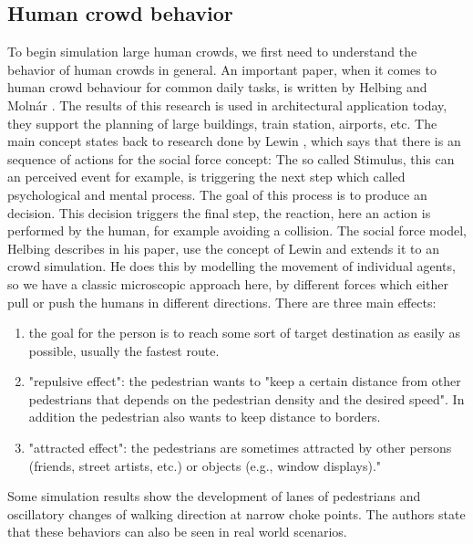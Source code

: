 \documentclass{acmsiggraph}               %
\begin{document}
\subsection{Human crowd behavior}
\label{chap:helbing} To begin simulation large human crowds, we first need to understand the behavior of human crowds in general. An important paper, when it comes to human crowd behaviour for common daily tasks, is written by Helbing and Molnár . 
 The results of this research is used in architectural application today, they support the planning of large buildings, train station, airports, etc.
The main concept states back to research done by Lewin , which says that there is an sequence of actions for the social force concept: The so called Stimulus, this can an perceived event for example, is triggering the next step which called psychological and mental process. The goal of this process is to produce an decision. This decision triggers the final step, the reaction, here an action is performed by the human, for example avoiding a collision.
The social force model, Helbing describes in his paper, use the concept of Lewin and extends it to an crowd simulation. He does this by modelling the movement of individual agents, so we have a classic microscopic approach here, by different forces which either pull or push the humans in different directions. There are three main effects: 
\begin{enumerate}
    \item the goal for the person is to reach some sort of target destination as easily as possible, usually the fastest route.
    \item "repulsive effect": the pedestrian wants to "keep a certain distance from other pedestrians that depends on the pedestrian density and the desired speed". In addition the pedestrian also wants to keep distance to borders.  
    \item "attracted effect": the pedestrians are sometimes attracted by other persons (friends, street artists, etc.) or objects (e.g., window displays)."
\end{enumerate}
Some simulation results show the development of lanes of pedestrians and oscillatory changes of walking direction at narrow choke points. The authors state that these behaviors can also be seen in real world scenarios. 
\end{document}
